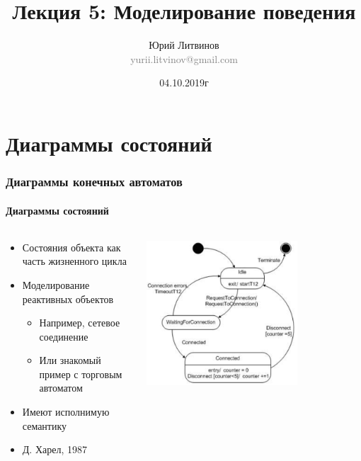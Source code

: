 \documentclass[xetex,mathserif,serif]{beamer}
\title[Моделирование поведения]{Лекция 5: Моделирование поведения}
\author[Юрий Литвинов]{Юрий Литвинов\\\small{\textcolor{gray}{yurii.litvinov@gmail.com}}}
\date{04.10.2019г}
\begin{document}
	\frame{\titlepage}

	\section{Диаграммы состояний}

	\begin{frame}
		\frametitle{Диаграммы конечных автоматов}
		\framesubtitle{Диаграммы состояний}
		\begin{columns}
			\begin{column}{0.5\textwidth}
				\begin{itemize}
					\item Состояния объекта как часть жизненного цикла
					\item Моделирование реактивных объектов
					\begin{itemize}
						\item Например, сетевое соединение
						\item Или знакомый пример с торговым автоматом
					\end{itemize}
					\item Имеют исполнимую семантику
					\item Д. Харел, 1987
				\end{itemize}
			\end{column}
			\begin{column}{0.5\textwidth}
				\begin{center}
					\includegraphics[width=0.7\textwidth]{stateTransitionExample.png}
				\end{center}
			\end{column}
		\end{columns}
	\end{frame}
\end{document}
